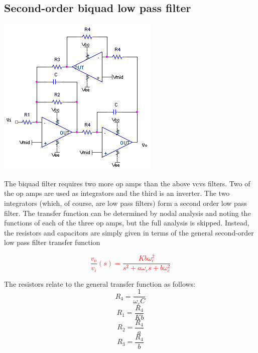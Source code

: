 \subsection{Second-order biquad low pass filter}
\begin{center}
	\includegraphics{schematics/2ndorderbiquadLPfilter.PNG}
\end{center}
The biquad filter requires two more op amps than the above \ac{vcvs} filters.
Two of the op amps are used as integrators and the third is an inverter.
The two integrators (which, of course, are low pass filters) form a second order low pass filter.
The transfer function can be determined by nodal analysis and noting the functions of each of the three op amps, but the full analysis is skipped.
Instead, the resistors and capacitors are simply given in terms of the general second-order low pass filter transfer function

\textcolor{red}{
\begin{equation}
\frac{v_{o}}{v_{i}}(s) = \frac{Kb\omega_{c}^{2}}{s^{2} + a\omega_{c}s + b\omega_{c}^{2}}
\label{eq:2ndorderbiquadLPfilter}
\end{equation}
}

The resistors relate to the general transfer function as follows:
\begin{equation}
R_4 = \frac{1}{\omega_{c}C}
\end{equation}
\begin{equation}
R_1 = \frac{R_4}{Kb}
\end{equation}
\begin{equation}
R_2 = \frac{R_4}{a}
\end{equation}
\begin{equation}
R_3 = \frac{R_4}{b}
\end{equation}

